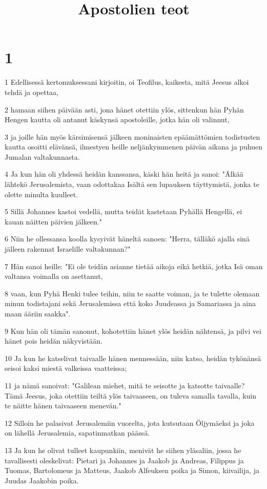 

\title{Apostolien teot}


\chapter{1}

\par 1 Edellisessä kertomuksessani kirjoitin, oi Teofilus, kaikesta, mitä Jeesus alkoi tehdä ja opettaa,
\par 2 hamaan siihen päivään asti, jona hänet otettiin ylös, sittenkun hän Pyhän Hengen kautta oli antanut käskynsä apostoleille, jotka hän oli valinnut,
\par 3 ja joille hän myös kärsimisensä jälkeen moninaisten epäämättömien todistusten kautta osoitti elävänsä, ilmestyen heille neljänkymmenen päivän aikana ja puhuen Jumalan valtakunnasta.
\par 4 Ja kun hän oli yhdessä heidän kanssansa, käski hän heitä ja sanoi: "Älkää lähtekö Jerusalemista, vaan odottakaa Isältä sen lupauksen täyttymistä, jonka te olette minulta kuulleet.
\par 5 Sillä Johannes kastoi vedellä, mutta teidät kastetaan Pyhällä Hengellä, ei kauan näitten päivien jälkeen."
\par 6 Niin he ollessansa koolla kysyivät häneltä sanoen: "Herra, tälläkö ajalla sinä jälleen rakennat Israelille valtakunnan?"
\par 7 Hän sanoi heille: "Ei ole teidän asianne tietää aikoja eikä hetkiä, jotka Isä oman valtansa voimalla on asettanut,
\par 8 vaan, kun Pyhä Henki tulee teihin, niin te saatte voiman, ja te tulette olemaan minun todistajani sekä Jerusalemissa että koko Juudeassa ja Samariassa ja aina maan ääriin saakka".
\par 9 Kun hän oli tämän sanonut, kohotettiin hänet ylös heidän nähtensä, ja pilvi vei hänet pois heidän näkyvistään.
\par 10 Ja kun he katselivat taivaalle hänen mennessään, niin katso, heidän tykönänsä seisoi kaksi miestä valkeissa vaatteissa;
\par 11 ja nämä sanoivat: "Galilean miehet, mitä te seisotte ja katsotte taivaalle? Tämä Jeesus, joka otettiin teiltä ylös taivaaseen, on tuleva samalla tavalla, kuin te näitte hänen taivaaseen menevän."
\par 12 Silloin he palasivat Jerusalemiin vuorelta, jota kutsutaan Öljymäeksi ja joka on lähellä Jerusalemia, sapatinmatkan päässä.
\par 13 Ja kun he olivat tulleet kaupunkiin, menivät he siihen yläsaliin, jossa he tavallisesti oleskelivat: Pietari ja Johannes ja Jaakob ja Andreas, Filippus ja Tuomas, Bartolomeus ja Matteus, Jaakob Alfeuksen poika ja Simon, kiivailija, ja Juudas Jaakobin poika.
